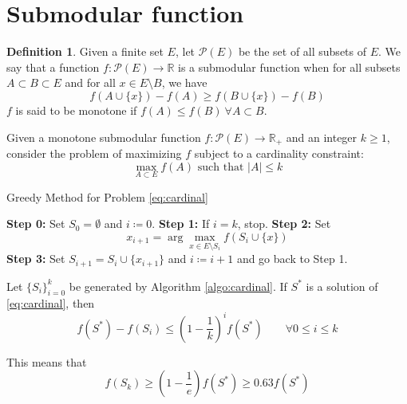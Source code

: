 \documentclass[11pt, openany]{report}
\newcommand{\R}{\mathbb{R}}
\theoremstyle{definition}
\newtheorem{definition}[thm]{Definition}
\begin{document}
\section{Submodular function}
\begin{definition}
    Given a finite set $E$, let $\mathcal{P}(E)$ be the set of all subsets of $E$. We say that a function $f:\mathcal{P}(E)\rightarrow \R$ is a submodular function when for all subsets $A\subset B\subset E$ and for all $x\in E\setminus B$, we have 
    \begin{equation}
        f(A\cup \{x\})-f(A) \ge f(B\cup \{x\})-f(B)
    \end{equation}
    $f$ is said to be monotone if $f(A)\le f(B)\: \forall A\subset B$.
\end{definition}
Given a monotone submodular function $f:\mathcal{P}(E)\rightarrow \R_+$ and an integer $k\ge 1$, consider the problem of maximizing $f$ subject to a cardinality constraint:
\begin{equation}\label{eq:cardinal}
    \max_{A\subset E} f(A) \text{ such that } |A| \le k
\end{equation}
\begin{algorithm}
    \caption{Greedy Method for Problem \eqref{eq:cardinal}}\label{algo:cardinal}
    \begin{algorithmic}[1]
    \State \textbf{Step 0:} Set $S_0=\emptyset$ and $i\coloneqq 0$.
    \State \textbf{Step 1:} If $i=k$, stop.
    \State \textbf{Step 2:} Set 
    \begin{equation}
        x_{i+1} = \arg\max_{x\in E\setminus S_i} f(S_i\cup \{x\})
    \end{equation}
    \State \textbf{Step 3:} Set $S_{i+1}=S_i\cup \{x_{i+1}\}$ and $i\coloneqq i+1$ and go back to Step 1.
    \end{algorithmic}
\end{algorithm}
\begin{tcolorbox}[breakable,
    colback=white,
    colframe=white!75!black,
    title={Theorem}]
Let $\{S_i\}_{i=0}^k$ be generated by Algorithm \ref{algo:cardinal}. If $S^*$ is a solution of \eqref{eq:cardinal}, then 
\begin{equation}
    f(S^*) -f(S_i) \le \left(1-\frac{1}{k}\right)^i f(S^*) \qquad \forall 0\le i \le k
\end{equation}
\end{tcolorbox}
This means that 
\begin{equation}
    f(S_k) \ge \left(1-\frac{1}{e}\right)f(S^*)\ge 0.63 f(S^*)
\end{equation}
\end{document}
